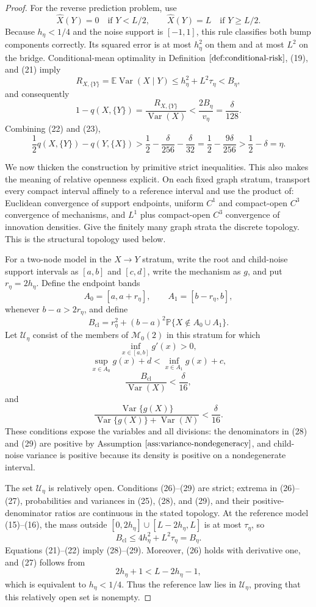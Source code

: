 \documentclass{article}
\begin{document}
\begin{proof}
For the reverse prediction problem, use
\[
 \widehat X(Y)=0\quad\text{if }Y<L/2,
 \qquad
 \widehat X(Y)=L\quad\text{if }Y\ge L/2.
\]
Because \(h_\eta<1/4\) and the noise support is \([-1,1]\), this rule classifies both bump components correctly.  Its squared error is at most \(h_\eta^2\) on them and at most \(L^2\) on the bridge.  Conditional-mean optimality in Definition \(\ref{def:conditional-risk}\), (19), and (21) imply
\[
 R_{X,\{Y\}}=\mathbb E\operatorname{Var}(X\mid Y)
 \le h_\eta^2+L^2\tau_\eta<B_\eta,
\]
and consequently
\[
 1-q(X,\{Y\})
 =\frac{R_{X,\{Y\}}}{\operatorname{Var}(X)}
 <\frac{2B_\eta}{v_\eta}
 =\frac{\delta}{128}. \tag{23}
\]
Combining (22) and (23),
\[
 \frac12q(X,\{Y\})-q(Y,\{X\})
 >\frac12-\frac{\delta}{256}-\frac{\delta}{32}
 =\frac12-\frac{9\delta}{256}
 >\frac12-\delta=\eta. \tag{24}
\]

We now thicken the construction by primitive strict inequalities.  This also makes the meaning of relative openness explicit.  On each fixed graph stratum, transport every compact interval affinely to a reference interval and use the product of: Euclidean convergence of support endpoints, uniform \(C^1\) and compact-open \(C^3\) convergence of mechanisms, and \(L^1\) plus compact-open \(C^3\) convergence of innovation densities.  Give the finitely many graph strata the discrete topology.  This is the structural topology used below.

For a two-node model in the \(X\to Y\) stratum, write the root and child-noise support intervals as \([a,b]\) and \([c,d]\), write the mechanism as \(g\), and put \(r_\eta=2h_\eta\).  Define the endpoint bands
\[
 A_0=[a,a+r_\eta],\qquad A_1=[b-r_\eta,b],
\]
whenever \(b-a>2r_\eta\), and define
\[
 B_{\mathrm{cl}}=r_\eta^2+(b-a)^2
 \mathbb P\{X\notin A_0\cup A_1\}. \tag{25}
\]
Let \(\mathcal U_\eta\) consist of the members of \(\mathcal M_0(2)\) in this stratum for which
\[
 \inf_{x\in[a,b]}g'(x)>0, \tag{26}
\]
\[
 \sup_{x\in A_0}g(x)+d
 <\inf_{x\in A_1}g(x)+c, \tag{27}
\]
\[
 \frac{B_{\mathrm{cl}}}{\operatorname{Var}(X)}<\frac{\delta}{16}, \tag{28}
\]
and
\[
 \frac{\operatorname{Var}\{g(X)\}}
 {\operatorname{Var}\{g(X)\}+\operatorname{Var}(N)}
 <\frac{\delta}{16}. \tag{29}
\]
These conditions expose the variables and all divisions: the denominators in (28) and (29) are positive by Assumption \(\ref{ass:variance-nondegeneracy}\), and child-noise variance is positive because its density is positive on a nondegenerate interval.

The set \(\mathcal U_\eta\) is relatively open.  Conditions (26)--(29) are strict; extrema in (26)--(27), probabilities and variances in (25), (28), and (29), and their positive-denominator ratios are continuous in the stated topology.  At the reference model (15)--(16), the mass outside \([0,2h_\eta]\cup[L-2h_\eta,L]\) is at most \(\tau_\eta\), so
\[
 B_{\mathrm{cl}}\le4h_\eta^2+L^2\tau_\eta=B_\eta.
\]
Equations (21)--(22) imply (28)--(29).  Moreover, (26) holds with derivative one, and (27) follows from
\[
 2h_\eta+1<L-2h_\eta-1,
\]
which is equivalent to \(h_\eta<1/4\).  Thus the reference law lies in \(\mathcal U_\eta\), proving that this relatively open set is nonempty.


\end{proof}
\end{document}
